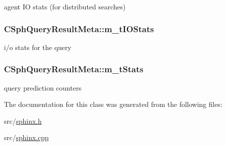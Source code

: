 agent I\-O stats (for distributed searches) 

\hypertarget{classCSphQueryResultMeta_a59801b7386119d26d7bee1a8c3428036}{
\subsubsection[{m\-\_\-t\-I\-O\-Stats}]{ C\-Sph\-Query\-Result\-Meta\-::m\-\_\-t\-I\-O\-Stats}}\label{classCSphQueryResultMeta_a59801b7386119d26d7bee1a8c3428036}


i/o stats for the query 

\hypertarget{classCSphQueryResultMeta_a4068160dff2389c2d12d6e54d0cd9411}{
\subsubsection[{m\-\_\-t\-Stats}]{ C\-Sph\-Query\-Result\-Meta\-::m\-\_\-t\-Stats}}\label{classCSphQueryResultMeta_a4068160dff2389c2d12d6e54d0cd9411}


query prediction counters 



The documentation for this class was generated from the following files\-:\begin{DoxyCompactItemize}
\item 
src/\hyperlink{sphinx_8h}{sphinx.\-h}\item 
src/\hyperlink{sphinx_8cpp}{sphinx.\-cpp}\end{DoxyCompactItemize}
